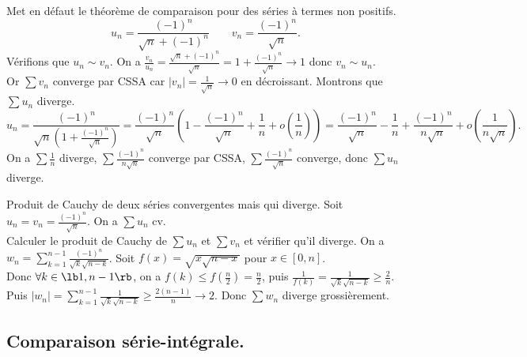 \documentclass[11pt]{article}
\begin{document}
\begin{ex}{Met en défaut le théorème de comparaison pour des séries à termes non positifs.}{}
    \begin{equation*}
        u_n = \frac{(-1)^n}{\sqrt{n}+(-1)^n} \qquad v_n = \frac{(-1)^n}{\sqrt{n}}.
    \end{equation*}
    \tcblower
    Vérifions que $u_n \sim v_n$. On a $\frac{v_n}{u_n}=\frac{\sqrt{n} + (-1)^n}{\sqrt{n}}=1+\frac{(-1)^n}{\sqrt{n}}\to 1$ donc $v_n \sim u_n$.\\
    Or $\sum v_n$ converge par CSSA car $|v_n|=\frac{1}{\sqrt{n}}\to0$ en décroissant. Montrons que $\sum u_n$ diverge.
    \begin{equation*}
        u_n = \frac{(-1)^n}{\sqrt{n}\left( 1 + \frac{(-1)^n}{\sqrt{n}} \right)} = \frac{(-1)^n}{\sqrt{n}}\left( 1-\frac{(-1)^n}{\sqrt{n}} + \frac{1}{n} + o(\frac{1}{n})\right) = \frac{(-1)^n}{\sqrt{n}} - \frac{1}{n} + \frac{(-1)^n}{n\sqrt{n}} + o(\frac{1}{n\sqrt{n}}).
    \end{equation*}
    On a $\sum \frac{1}{n}$ diverge, $\sum \frac{(-1)^n}{n\sqrt{n}}$ converge par CSSA, $\sum\frac{(-1)^n}{\sqrt{n}}$ converge, donc $\sum u_n$ diverge.
\end{ex}

\vspace*{-0.7cm}

\begin{ex}{Produit de Cauchy de deux séries convergentes mais qui diverge.}{}
    Soit $u_n=v_n=\frac{(-1)^n}{\sqrt{n}}$. On a $\sum u_n$ cv.\\
    Calculer le produit de Cauchy de $\sum u_n$ et $\sum v_n$ et vérifier qu'il diverge.
    \tcblower
    On a $w_n = \sum_{k=1}^{n-1} \frac{(-1)^n}{\sqrt{k}\sqrt{n-k}}$. Soit $f(x)=\sqrt{x\sqrt{n-x}}$ pour $x\in[0,n]$.\\
    Donc $\forall k \in \lb1,n-1\rb$, on a $f(k)\leq f(\frac{n}{2})=\frac{n}{2}$, puis $\frac{1}{f(k)}=\frac{1}{\sqrt{k}\sqrt{n-k}}\geq\frac{2}{n}$.\\
    Puis $|w_n|=\sum_{k=1}^{n-1}\frac{1}{\sqrt{k}\sqrt{n-k}}\geq\frac{2(n-1)}{n}\to2$. Donc $\sum w_n$ diverge grossièrement.
\end{ex}

\vspace*{-0.7cm}

\subsection{Comparaison série-intégrale.}
\end{document}

